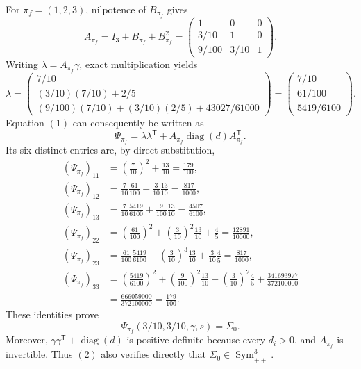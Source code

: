 For \(\pi_f=(1,2,3)\), nilpotence of \(B_{\pi_f}\) gives
\[
 A_{\pi_f}=I_3+B_{\pi_f}+B_{\pi_f}^2
 =\begin{pmatrix}
 1&0&0\\[2pt]
 3/10&1&0\\[2pt]
 9/100&3/10&1
 \end{pmatrix}.
\]
Writing \(\lambda=A_{\pi_f}\gamma\), exact multiplication yields
\[
 \lambda
 =\begin{pmatrix}
 7/10\\[2pt]
 (3/10)(7/10)+2/5\\[2pt]
 (9/100)(7/10)+(3/10)(2/5)+43027/61000
 \end{pmatrix}
 =\begin{pmatrix}7/10\\[2pt]61/100\\[2pt]5419/6100\end{pmatrix}.
\]
Equation \((1)\) can consequently be written as
\[
 \Psi_{\pi_f}=\lambda\lambda^{\mathsf T}
 +A_{\pi_f}\operatorname{diag}(d)A_{\pi_f}^{\mathsf T}.
\]
Its six distinct entries are, by direct substitution,
\[
 \begin{aligned}
 (\Psi_{\pi_f})_{11}
 &=\left(\frac7{10}\right)^2+\frac{13}{10}=\frac{179}{100},\\
 (\Psi_{\pi_f})_{12}
 &=\frac7{10}\frac{61}{100}+\frac3{10}\frac{13}{10}=\frac{817}{1000},\\
 (\Psi_{\pi_f})_{13}
 &=\frac7{10}\frac{5419}{6100}+\frac9{100}\frac{13}{10}=\frac{4507}{6100},\\
 (\Psi_{\pi_f})_{22}
 &=\left(\frac{61}{100}\right)^2+\left(\frac3{10}\right)^2\frac{13}{10}+\frac45
 =\frac{12891}{10000},\\
 (\Psi_{\pi_f})_{23}
 &=\frac{61}{100}\frac{5419}{6100}
 +\left(\frac3{10}\right)^3\frac{13}{10}
 +\frac3{10}\frac45
 =\frac{817}{1000},\\
 (\Psi_{\pi_f})_{33}
 &=\left(\frac{5419}{6100}\right)^2
 +\left(\frac9{100}\right)^2\frac{13}{10}
 +\left(\frac3{10}\right)^2\frac45
 +\frac{341693977}{372100000}\\
 &=\frac{666059000}{372100000}=\frac{179}{100}.
 \end{aligned}
\]
These identities prove
\[
 \Psi_{\pi_f}(3/10,3/10,\gamma,s)=\Sigma_0.
 \tag{2}
\]
Moreover, \(\gamma\gamma^{\mathsf T}+\operatorname{diag}(d)\) is positive definite because every \(d_i>0\), and \(A_{\pi_f}\) is invertible.  Thus \((2)\) also verifies directly that \(\Sigma_0\in\operatorname{Sym}_{++}^3\).

